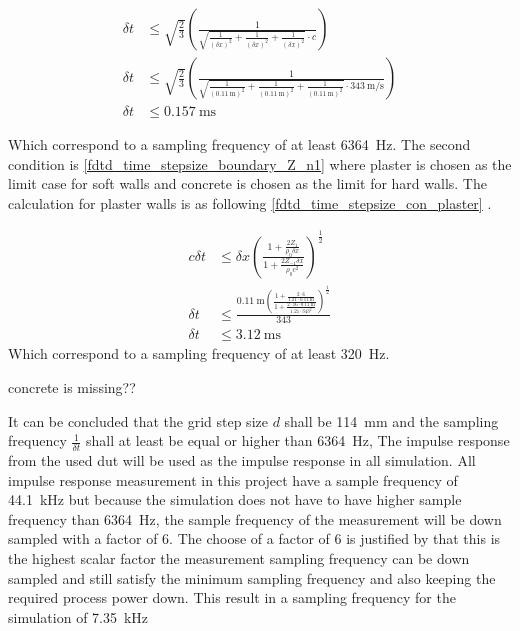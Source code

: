  
    \begin{subequations}\label{fdtd_time_stepsize_con_one}
\begin{alignat}{2}
\delta t &\leq \sqrt{\frac{2}{3}}  \left( \frac{1}{\sqrt{\frac{1}{(\delta x)^2}+\frac{1}{(\delta x)^2}+\frac{1}{(\delta x)^2} }\cdot c} \right)\\
\delta t &\leq \sqrt{\frac{2}{3}}  \left( \frac{1}{\sqrt{\frac{1}{(\SI{0.11}{\meter})^2}+\frac{1}{(\SI{0.11}{\meter})^2}+\frac{1}{(\SI{0.11}{\meter})^2} }\cdot \SI{343}{\meter\per\second}} \right)\\
\delta t &\leq \SI{0.157}{\milli\second} 
\end{alignat}
\end{subequations}
    
 Which correspond to a sampling frequency of at least \SI{6364}{\hertz}. The second condition is \autoref{fdtd_time_stepsize_boundary_Z_n1} where plaster is chosen as the limit case for soft walls and concrete is chosen as the limit for hard walls. The calculation for plaster walls is as following \autoref{fdtd_time_stepsize_con_plaster} \citep{finiteproblems}.
 
     \begin{subequations}\label{fdtd_time_stepsize_con_plaster}
\begin{alignat}{2}
c \delta t &\leq \delta x \left(   \frac{1+\frac{2Z_1}{\rho_0 \delta x}}{1+\frac{2Z_{-1} \delta x}{\rho_0 c^2}}  \right)^{\frac{1}{2}}\\
 \delta t &\leq \frac{\SI{0.11}{\meter} \left(   \frac{1+\frac{2\cdot 6}{1.21 \cdot \SI{0.11}{\meter}}}{1+\frac{2 \cdot 16 \cdot \SI{0.11}{\meter}}{1.21 \cdot {343}^2}}  \right)^{\frac{1}{2}}}{343}\\
\delta t &\leq \SI{3.12}{\milli\second} 
\end{alignat}
\end{subequations}
 Which correspond to a sampling frequency of at least \SI{320}{\hertz}.


concrete is missing??


It can be concluded that the grid step size $d$ shall be \SI{114}{\milli\meter} and the sampling frequency $\frac{1}{\delta t}$ shall at least be equal or higher than \SI{6364}{\hertz}, The impulse response from the used \gls{dut} will be used as the impulse response in all simulation. All impulse response measurement in this project have a sample frequency of \SI{44.1}{\kilo\hertz} but because the simulation does not have to have higher sample frequency than \SI{6364}{\hertz}, the sample frequency of the measurement will be down sampled with a factor of 6. The choose of a factor of 6 is justified by that this is the highest scalar factor the measurement sampling frequency can be down sampled  and still satisfy the minimum sampling frequency and also keeping the required process power down. This result in a sampling frequency for the simulation of \SI{7.35}{\kilo\hertz}

